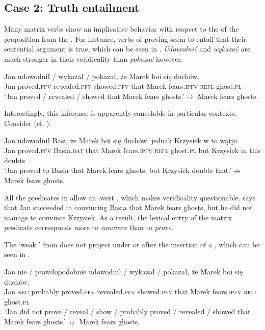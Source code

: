 \documentclass[output=paper,  modfonts,  newtxmath,  hidelinks		  ]{langscibook}
\begin{document}
\subsection{Case 2: {T}ruth entailment}

Many  matrix verbs show an implicative behavior with respect to the  of the proposition from the . For instance, verbs of proving seem to entail that their sentential argument is true, which can be seen in . \textit{Udowodnić} and \textit{wykazać} are much stronger in their veridicality than \textit{pokazać} however.

\ea\label{21:17}
\gll Jan udowodnił / wykazał / pokazał, że Marek boi się duchów.\\
Jan proved.\textsc{pfv} {} revealed.\textsc{pfv} {} showed.\textsc{pfv} that Marek fears.\textsc{ipfv} \textsc{refl} ghost.\textsc{pl}\\
\glt	`Jan proved / revealed / showed that Marek fears ghosts.'\newline$\rightarrow$ Marek fears ghosts.
\z

\noindent Interestingly, this inference is apparently cancelable in particular contexts. Consider  (cf. \citealt[74]{AnandHacquard2014}).

\ea\label{21:18}
\gll Jan udowodnił Basi, że Marek boi się duchów, jednak Krzysiek w to wątpi.\\
Jan proved.\textsc{pfv} Basia.\textsc{dat} that Marek fears.\textsc{ipfv} \textsc{refl} ghost.\textsc{pl} but Krzysiek in this doubts\\
\glt	`Jan proved to Basia that Marek fears ghosts, but Krzysiek doubts that.'\newline$\nrightarrow$  Marek fears ghosts.
\z

\noindent All the predicates in  allow an overt , which makes veridicality questionable.  says that Jan succeeded in convincing Basia that Marek fears ghosts, but he did not manage to convince Krzysiek. As a result, the lexical entry of the matrix predicate corresponds more to \textit{convince} than to \textit{prove}.

The ‘weak ’ from  does not project under  or after the insertion of a , which can be seen in .

\ea\label{21:19}
\gll Jan nie / prawdopodobnie udowodnił / wykazał / pokazał, że Marek boi się duchów.\\
Jan \textsc{neg} {} probably proved.\textsc{pfv} {} revealed.\textsc{pfv} {} showed.\textsc{pfv} that Marek fears.\textsc{ipfv} \textsc{refl} ghost.\textsc{pl}\\
\glt	`Jan did not prove / reveal / show / probably proved / revealed / showed that Marek fears ghosts.'\newline$\nrightarrow$  Marek fears ghosts.
\z
\end{document}

